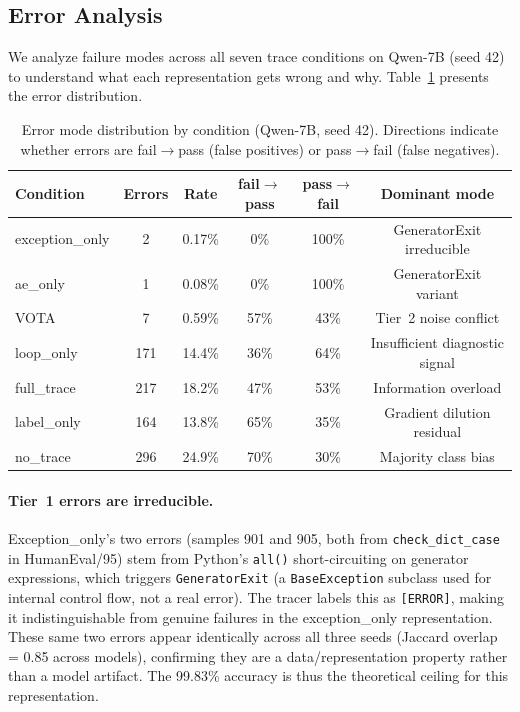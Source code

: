 \documentclass[11pt,a4paper]{article}
\begin{document}
\subsection{Error Analysis}
\label{sec:error}

We analyze failure modes across all seven trace conditions on Qwen-7B (seed 42) to understand what each representation gets wrong and why. Table~\ref{tab:errors} presents the error distribution.

\begin{table}[t]
\centering
\caption{Error mode distribution by condition (Qwen-7B, seed 42). Directions indicate whether errors are fail$\to$pass (false positives) or pass$\to$fail (false negatives).}
\label{tab:errors}
\small
\begin{tabular}{@{}lccccc@{}}
\toprule
Condition & Errors & Rate & fail$\to$pass & pass$\to$fail & Dominant mode \\
\midrule
exception\_only & 2   & 0.17\% & 0\%  & 100\% & GeneratorExit irreducible \\
ae\_only        & 1   & 0.08\% & 0\%  & 100\% & GeneratorExit variant \\
VOTA            & 7   & 0.59\% & 57\% & 43\%  & Tier~2 noise conflict \\
loop\_only      & 171 & 14.4\% & 36\% & 64\%  & Insufficient diagnostic signal \\
full\_trace     & 217 & 18.2\% & 47\% & 53\%  & Information overload \\
label\_only     & 164 & 13.8\% & 65\% & 35\%  & Gradient dilution residual \\
no\_trace       & 296 & 24.9\% & 70\% & 30\%  & Majority class bias \\
\bottomrule
\end{tabular}
\end{table}

\paragraph{Tier~1 errors are irreducible.} Exception\_only's two errors (samples 901 and 905, both from \texttt{check\_dict\_case} in HumanEval/95) stem from Python's \texttt{all()} short-circuiting on generator expressions, which triggers \texttt{GeneratorExit} (a \texttt{BaseException} subclass used for internal control flow, not a real error). The tracer labels this as \texttt{[ERROR]}, making it indistinguishable from genuine failures in the exception\_only representation. These same two errors appear identically across all three seeds (Jaccard overlap = 0.85 across models), confirming they are a data/representation property rather than a model artifact. The 99.83\% accuracy is thus the theoretical ceiling for this representation.
\end{document}
